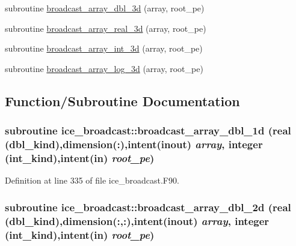 \begin{DoxyCompactItemize}
\item 
subroutine \hyperlink{namespaceice__broadcast_ab80a5a2d64cdf81863b36b8cd172e6d8}{broadcast\_\-array\_\-dbl\_\-3d} (array, root\_\-pe)
\item 
subroutine \hyperlink{namespaceice__broadcast_ae4afcd48d77d13d0acf16f33a390d4c6}{broadcast\_\-array\_\-real\_\-3d} (array, root\_\-pe)
\item 
subroutine \hyperlink{namespaceice__broadcast_a54da6a1350f99173ecc9afbdad4230b0}{broadcast\_\-array\_\-int\_\-3d} (array, root\_\-pe)
\item 
subroutine \hyperlink{namespaceice__broadcast_a7b9a7cb04f157e736b41e8f0fb4f595a}{broadcast\_\-array\_\-log\_\-3d} (array, root\_\-pe)
\end{DoxyCompactItemize}


\subsection{Function/Subroutine Documentation}
\hypertarget{namespaceice__broadcast_a662e8645225841aedf367a75226b54e6}{
\subsubsection[{broadcast\_\-array\_\-dbl\_\-1d}]{\setlength{\rightskip}{0pt plus 5cm}subroutine ice\_\-broadcast::broadcast\_\-array\_\-dbl\_\-1d (real (dbl\_\-kind),dimension(:),intent(inout) {\em array}, \/  integer (int\_\-kind),intent(in) {\em root\_\-pe})}}
\label{namespaceice__broadcast_a662e8645225841aedf367a75226b54e6}


Definition at line 335 of file ice\_\-broadcast.F90.\hypertarget{namespaceice__broadcast_a52007fa2d05a9a9202b79ae38da8dfc8}{
\subsubsection[{broadcast\_\-array\_\-dbl\_\-2d}]{\setlength{\rightskip}{0pt plus 5cm}subroutine ice\_\-broadcast::broadcast\_\-array\_\-dbl\_\-2d (real (dbl\_\-kind),dimension(:,:),intent(inout) {\em array}, \/  integer (int\_\-kind),intent(in) {\em root\_\-pe})}}
\label{namespaceice__broadcast_a52007fa2d05a9a9202b79ae38da8dfc8}


